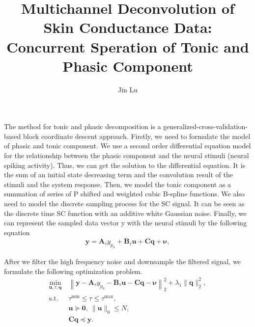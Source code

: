 \documentclass[]{article}
\title{Multichannel Deconvolution of Skin Conductance Data: Concurrent Speration of Tonic and Phasic Component}
\author{Jin Lu}
\begin{document}
\maketitle

The method for tonic and phasic decomposition is  a generalized-cross-validation-based block coordinate descent approach. Firstly, we need to formulate the model of phasic and tonic component. We use a second order differential equation model for the relationship between the phasic component and the neural stimuli (neural spiking activity). Thus, we can get the solution to the differential equation. It is the sum of an initial state decreasing term and the convolution result of the stimuli and the system response. Then, we model the tonic component as a summation of series of P shifted and weighted cubic B-spline functions. We also need to model the discrete sampling process for the SC signal. It can be seen as the discrete time SC function with an additive white Gaussian noise. Finally, we can represent the sampled data vector y with the neural stimuli by the following equation
\begin{align}
  \mathbf{y} = \mathbf{A}_\tau y_{p_0} + \mathbf{B}_\tau \mathbf{u} + \mathbf{C} \mathbf{q} + \boldsymbol{\nu},
\end{align}

After we filter the high frequency noise and downsample the filtered signal, we formulate the following optimization problem.
\begin{subequations}
  \renewcommand{\theequation}
  {\theparentequation-\arabic{equation}}
  \begin{align}
  \min\limits_{\mathbf{u}, \tau, \mathbf{q}}~&\left\lVert \mathbf{y} - \mathbf{A}_\tau y_{p_0} - \mathbf{B}_\tau \mathbf{u} - \mathbf{C} \mathbf{q} - \boldsymbol{\nu} \right\lVert^2_2 + \lambda_1 \lVert \mathbf{q} \rVert_2^2, \\
  \mathrm{s.t.}~& \tau^{\mathrm{min}} \leqslant \tau \leqslant \tau^{\mathrm{max}}, \\
  & \mathbf{u} \succcurlyeq \mathbf{0},~ \lVert \mathbf{u} \rVert_0 \leqslant N, \\
  & \mathbf{C}\mathbf{q} \preccurlyeq \mathbf{y}.
  \end{align}
\end{subequations}
\end{document}

